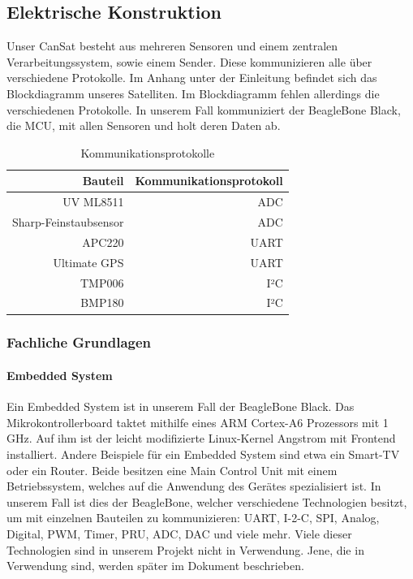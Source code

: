 \subsection{Elektrische Konstruktion}
Unser CanSat besteht aus mehreren Sensoren und einem zentralen Verarbeitungssystem, sowie einem Sender. Diese kommunizieren alle über verschiedene Protokolle. Im Anhang unter der Einleitung befindet sich das Blockdiagramm unseres Satelliten. Im Blockdiagramm fehlen allerdings die verschiedenen Protokolle. In unserem Fall kommuniziert der BeagleBone Black, die MCU, mit allen Sensoren und holt deren Daten ab.

\begin{table}[H]
  \centering
    \begin{tabular}{rr}
    \toprule
    \textbf{Bauteil} & \textbf{Kommunikationsprotokoll} \\
    \midrule 
    UV ML8511 & ADC \\
    Sharp-Feinstaubsensor & ADC \\
    APC220 & UART \\
    Ultimate GPS & UART \\
    TMP006 & I²C \\
    BMP180 & I²C \\
    \bottomrule
    \end{tabular}
    \caption{Kommunikationsprotokolle}
\end{table}

\subsubsection{Fachliche Grundlagen}
\paragraph{Embedded System}
Ein Embedded System ist in unserem Fall der BeagleBone Black. Das Mikrokontrollerboard taktet mithilfe eines ARM Cortex-A6 Prozessors mit 1 GHz. Auf ihm ist der leicht modifizierte Linux-Kernel Angstrom mit Frontend installiert. Andere Beispiele für ein Embedded System sind etwa ein Smart-TV oder ein Router. Beide besitzen eine Main Control Unit mit einem Betriebssystem, welches auf die Anwendung des Gerätes spezialisiert ist. In unserem Fall ist dies der BeagleBone, welcher verschiedene Technologien besitzt, um mit einzelnen Bauteilen zu kommunizieren: UART, I-2-C, SPI, Analog, Digital, PWM, Timer, PRU, ADC, DAC und viele mehr. Viele dieser Technologien sind in unserem Projekt nicht in Verwendung. Jene, die in Verwendung sind, werden später im Dokument beschrieben.


